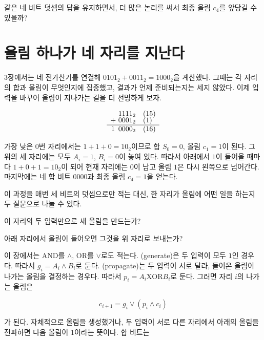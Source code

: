 \begin{objectivebox}
같은 네 비트 덧셈의 답을 유지하면서, 더 많은 논리를 써서 최종 올림 \(c_4\)를 앞당길 수 있을까?
\end{objectivebox}

\section{올림 하나가 네 자리를 지난다}

3장에서는 네 전가산기를 연결해 \(0101_2+0011_2=1000_2\)을 계산했다. 그때는 각 자리의 합과 올림이 무엇인지에 집중했고, 결과가 언제 준비되는지는 세지 않았다. 이제 입력을 바꾸어 올림이 지나가는 길을 더 선명하게 보자.

\[
\begin{array}{r@{\ }l}
  &1111_2 \quad (15)\\[-1mm]
{}+&0001_2 \quad (1)\\
\hline
1\,&0000_2 \quad (16)
\end{array}
\]

가장 낮은 0번 자리에서는 \(1+1+0=10_2\)이므로 합 \(S_0=0\), 올림 \(c_1=1\)이 된다. 그 위의 세 자리에는 모두 \(A_i=1\), \(B_i=0\)이 놓여 있다. 따라서 아래에서 \(1\)이 들어올 때마다 \(1+0+1=10_2\)이 되어 현재 자리에는 \(0\)이 남고 올림 \(1\)은 다시 왼쪽으로 넘어간다. 마지막에는 네 합 비트 \(0000\)과 최종 올림 \(c_4=1\)을 얻는다.

이 과정을 매번 세 비트의 덧셈으로만 적는 대신, 한 자리가 올림에 어떤 일을 하는지 두 질문으로 나눌 수 있다.

\begin{description}[style=nextline,leftmargin=2.5em,font=\sffamily\bfseries]
  \item[생성 \(g_i\)] 이 자리의 두 입력만으로 새 올림을 만드는가?
  \item[전파 \(p_i\)] 아래 자리에서 올림이 들어오면 그것을 위 자리로 보내는가?
\end{description}

이 장에서는 AND를 \(\land\), OR를 \(\lor\)로도 적는다. (generate)은 두 입력이 모두 \(1\)인 경우다. 따라서 \(g_i=A_i\mathbin{\land}B_i\)로 둔다. (propagate)는 두 입력이 서로 달라, 들어온 올림이 나가는 올림을 결정하는 경우다. 따라서 \(p_i=A_i\mathbin{\mathrm{XOR}}B_i\)로 둔다. 그러면 자리 \(i\)의 나가는 올림은

\[
  c_{i+1}=g_i\mathbin{\lor}(p_i\mathbin{\land}c_i)
\]

가 된다. 자체적으로 올림을 생성했거나, 두 입력이 서로 다른 자리에서 아래의 올림을 전파하면 다음 올림이 \(1\)이라는 뜻이다. 합 비트는

